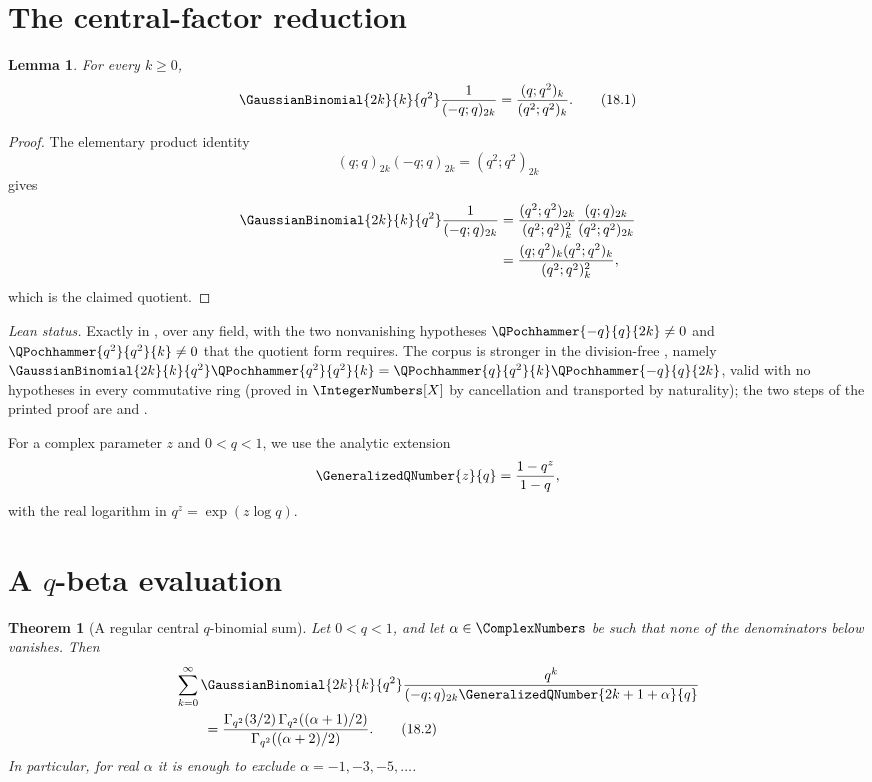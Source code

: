 \documentclass[11pt,a4paper,oneside,openany]{book}
\newtheorem{theorem}{Theorem}[chapter]
\newtheorem{lemma}[lemma]{Lemma}
\theoremstyle{definition}
\theoremstyle{remark}
\begin{document}
\section{The central-factor reduction}

\begin{lemma}\label{lem:central-reduction}
For every $k\ge0$,
\[
 \GaussianBinomial{2k}{k}{q^2}\frac1{(-q;q)_{2k}}
 =\frac{(q;q^2)_k}{(q^2;q^2)_k}.
 \tag{18.1}\label{eq:central-reduction}
\]
\end{lemma}

\begin{proof}
The elementary product identity
\[
 (q;q)_{2k}(-q;q)_{2k}=(q^2;q^2)_{2k}
\]
gives
\begin{align*}
 \GaussianBinomial{2k}{k}{q^2}\frac1{(-q;q)_{2k}}
 &=\frac{(q^2;q^2)_{2k}}{(q^2;q^2)_k^2}
   \frac{(q;q)_{2k}}{(q^2;q^2)_{2k}}\\
 &=\frac{(q;q^2)_k(q^2;q^2)_k}{(q^2;q^2)_k^2},
\end{align*}
which is the claimed quotient.
\end{proof}
\emph{Lean status.}  Exactly  in
, over any field, with the two nonvanishing hypotheses
\(\QPochhammer{-q}{q}{2k}\ne0\) and \(\QPochhammer{q^2}{q^2}{k}\ne0\) that the quotient form
requires.  The corpus is stronger in the division-free
, namely
\(\GaussianBinomial{2k}{k}{q^2}\QPochhammer{q^2}{q^2}{k}
 =\QPochhammer{q}{q^2}{k}\QPochhammer{-q}{q}{2k}\), valid with no hypotheses in every commutative
ring (proved in \(\IntegerNumbers[X]\) by cancellation and transported by naturality); the two
steps of the printed proof are  and
.


For a complex parameter $z$ and $0<q<1$, we use the analytic extension
\[
 \GeneralizedQNumber{z}{q}=\frac{1-q^z}{1-q},
\]
with the real logarithm in $q^z=\exp(z\log q)$.

\section{A \texorpdfstring{$q$}{q}-beta evaluation}

\begin{theorem}[A regular central $q$-binomial sum]\label{thm:regular-central-sum}
Let $0<q<1$, and let $\alpha\in\ComplexNumbers$ be such that none of the denominators below vanishes.  Then
\begin{align}
 &\sum_{k=0}^{\infty}
 \GaussianBinomial{2k}{k}{q^2}
 \frac{q^k}{(-q;q)_{2k}\GeneralizedQNumber{2k+1+\alpha}{q}}
 \notag\\
 &\qquad=
 \frac{\Gamma_{q^2}(3/2)\,
       \Gamma_{q^2}((\alpha+1)/2)}
      {\Gamma_{q^2}((\alpha+2)/2)}.
 \tag{18.2}\label{eq:regular-central-sum}
\end{align}
In particular, for real $\alpha$ it is enough to exclude
$\alpha=-1,-3,-5,\ldots$.
\end{theorem}
\end{document}
